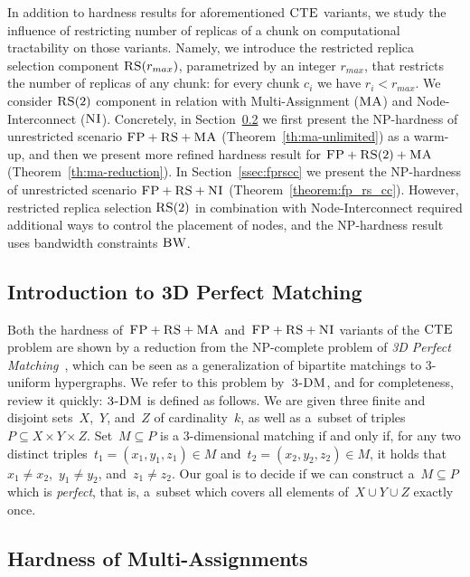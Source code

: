 In addition to hardness results for aforementioned $\textsc{CTE}$ variants, we study the influence of restricting number of replicas of a chunk on computational tractability on those variants.
Namely, we introduce the restricted replica selection component $\textsc{RS}(r_{max})$, parametrized by an integer $r_{max}$, that restricts the number of replicas of any chunk: for every chunk $c_i$ we have $r_i < r_{max}$.
We consider $\textsc{RS}(2)$ component in relation with Multi-Assignment ($\textsc{MA}$) and Node-Interconnect ($\textsc{NI}$).
Concretely, in Section~\ref{ssec:fprsma} we first present the NP-hardness of unrestricted scenario $\textsc{FP}+\textsc{RS}+\textsc{MA}$ (Theorem~\ref{th:ma-unlimited}) as a warm-up,
and then we present more refined hardness result for $\textsc{FP}+\textsc{RS}(2)+\textsc{MA}$ (Theorem~\ref{th:ma-reduction}). In Section~\ref{ssec:fprscc} we present the NP-hardness of unrestricted scenario $\textsc{FP}+\textsc{RS}+\textsc{NI}$ (Theorem~\ref{theorem:fp_rs_cc}).
However, restricted replica selection $\textsc{RS}(2)$ in combination with Node-Interconnect required additional ways to control the placement of nodes, and the NP-hardness result uses bandwidth constraints $\textsc{BW}$.

\subsection{Introduction to 3D Perfect Matching}
\label{sec:3dm_intro}

Both the hardness of~$\textsc{FP}+\textsc{RS}+\textsc{MA}$ and~$\textsc{FP}+\textsc{RS}+\textsc{NI}$ variants of the $\textsc{CTE}$ problem are shown by a reduction
from the NP-complete problem of \emph{3D Perfect Matching}~\cite{3dmatch},
which can be seen as a generalization of bipartite matchings to 3-uniform
hypergraphs. We refer to this problem by~$\textsc{3-DM}$, and for completeness,
review it quickly:
$\textsc{3-DM}$ is defined as follows. We are given three finite and disjoint
sets~$X$,~$Y$, and~$Z$ of cardinality~$k$, as well as a~subset of triples~$P\subseteq
X \times Y \times Z$.  Set~$M \subseteq P$ is a 3-dimensional matching
if and only if, for any two distinct triples~$t_1=(x_1, y_1, z_1) \in M$
and~$t_2=(x_2, y_2, z_2) \in M$, it holds that~$x_1\neq x_2$,~$y_1\neq
y_2$, and~$z_1\neq z_2$. Our goal is to decide if we can construct
a~$M \subseteq P$ which is \emph{perfect}, that is, a~subset which covers all
elements of~$X \cup Y \cup Z$ exactly once.


\subsection{Hardness of Multi-Assignments}\label{ssec:fprsma}

